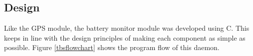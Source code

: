 \subsection {Design}

Like the GPS module, the battery monitor module was developed using C. This keeps in line with the design principles of making each component as simple as possible. Figure \ref{tbsflowchart} shows the program flow of this daemon.




